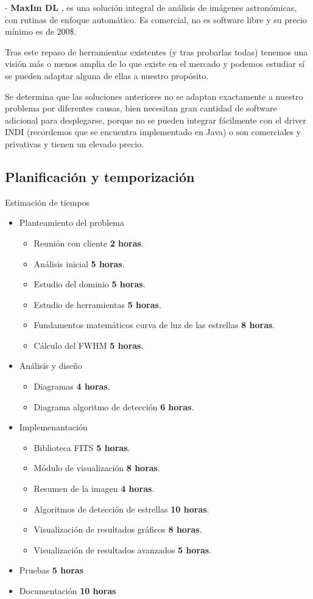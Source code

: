 - \textbf{MaxIm DL} \cite{maximdl}, es una solución integral de análisis de imágenes astronómicas, con rutinas de enfoque automático. Es comercial, no es software libre y su precio mínimo es de 200\$.


Tras este repaso de herramientas existentes (y tras probarlas todas) tenemos una visión más o menos amplia de lo que existe en el mercado y podemos estudiar sí se pueden adaptar alguna de ellas a nuestro propósito.


Se determina que las soluciones anteriores no se adaptan exactamente a nuestro problema por diferentes causas, bien necesitan gran cantidad de software adicional para desplegarse, porque no se pueden integrar fácilmente con el driver INDI (recordemos que se encuentra implementado en Java) o son comerciales y privativas y tienen un elevado precio.


\subsection{Planificación y temporización}

Estimación de tiempos

\begin{itemize}
	\item Planteamiento del problema
	\begin{itemize}
		\item Reunión con cliente \textbf{2 horas}.
		\item Análisis inicial \textbf{5 horas}.
		\item Estudio del dominio \textbf{5 horas}.
		\item Estudio de herramientas \textbf{5 horas}.
		\item Fundamentos matemáticos curva de luz de las estrellas \textbf{8 horas}.
		\item Cálculo del FWHM \cite{fwhm} \textbf{5 horas}.
	\end{itemize}
	\item Análisis y diseño
	\begin{itemize}
		\item Diagramas \textbf{4 horas}.
		\item Diagrama algoritmo de detección \textbf{6 horas}.
	\end{itemize}
	\item Implemenantación
	\begin{itemize}
		\item Biblioteca FITS \textbf{5 horas}.
		\item Módulo de visualización \textbf{8 horas}.
		\item Resumen de la imagen \textbf{4 horas}.
		\item Algoritmos de detección de estrellas \textbf{10 horas}.
		\item Visualización de resultados gráficos \textbf{8 horas}.
		\item Visualización de resultados avanzados \textbf{5 horas}.
	\end{itemize}
	\item Pruebas \textbf{5 horas}
	\item Documentación \textbf{10 horas}

\end{itemize}

